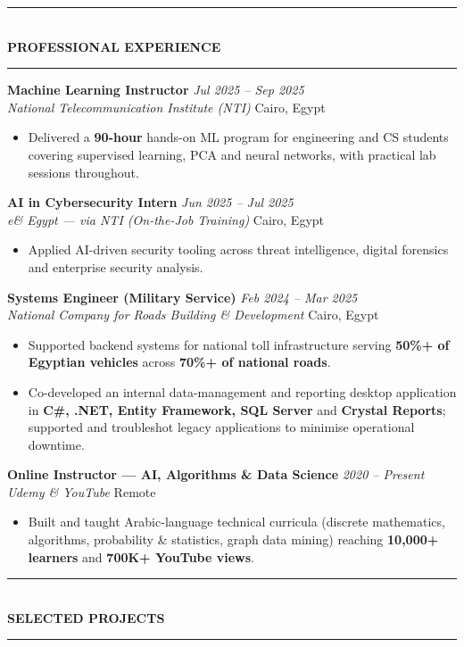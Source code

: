 \documentclass[10pt, a4paper]{article}
\newcommand{\cvsection}[1]{%
  \vspace{3pt}%
  {\color{navy}\rule{\linewidth}{1.1pt}}\\[0.5pt]%
  {\color{navy}\bfseries\fontsize{9.5}{11}\selectfont\uppercase{#1}}\\[-4pt]%
  {\color{teal}\rule{\linewidth}{0.6pt}}%
  \vspace{2pt}%
}
\newcommand{\cventry}[4]{%
  \vspace{2.5pt}%
  \textbf{\color{darkgray}#1} \hfill {\color{midgray}\textit{#3}}\\[-1.5pt]%
  {\color{teal}\textit{#2}} \hfill {\color{midgray}#4}%
}
\newenvironment{cvitems}{%
  \begin{itemize}[leftmargin=11pt, itemsep=0.5pt, parsep=0pt, topsep=1pt,
                  label={\textcolor{teal}{$\bullet$}}]
}{%
  \end{itemize}%
}
\begin{document}
\cvsection{Professional Experience}

\cventry{Machine Learning Instructor}{National Telecommunication Institute (NTI)}
        {Jul 2025 -- Sep 2025}{Cairo, Egypt}
\begin{cvitems}
  \item Delivered a \textbf{90-hour} hands-on ML program for engineering and CS students covering supervised learning, PCA and neural networks, with practical lab sessions throughout.
\end{cvitems}

\cventry{AI in Cybersecurity Intern}{e\& Egypt --- via NTI (On-the-Job Training)}
        {Jun 2025 -- Jul 2025}{Cairo, Egypt}
\begin{cvitems}
  \item Applied AI-driven security tooling across threat intelligence, digital forensics and enterprise security analysis.
\end{cvitems}

\cventry{Systems Engineer (Military Service)}{National Company for Roads Building \& Development}
        {Feb 2024 -- Mar 2025}{Cairo, Egypt}
\begin{cvitems}
  \item Supported backend systems for national toll infrastructure serving \textbf{50\%+ of Egyptian vehicles} across \textbf{70\%+ of national roads}.
  \item Co-developed an internal data-management and reporting desktop application in \textbf{C\#, .NET, Entity Framework, SQL Server} and \textbf{Crystal Reports}; supported and troubleshot legacy applications to minimise operational downtime.
\end{cvitems}

\cventry{Online Instructor --- AI, Algorithms \& Data Science}{Udemy \& YouTube}
        {2020 -- Present}{Remote}
\begin{cvitems}
  \item Built and taught Arabic-language technical curricula (discrete mathematics, algorithms, probability \& statistics, graph data mining) reaching \textbf{10,000+ learners} and \textbf{700K+ YouTube views}.
\end{cvitems}

\cvsection{Selected Projects}
\end{document}
